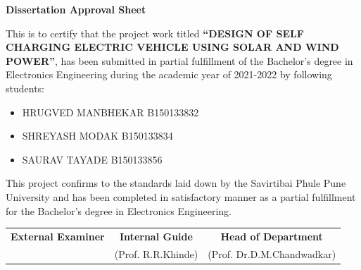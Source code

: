\documentclass[a4paper,12pt]{article}
\begin{document}
\newpage
\thispagestyle{empty}
\begin{center}
\Large\textbf{Dissertation Approval Sheet}\\[1cm]
\end{center}
\large This is to certify that the project work titled \textbf{“DESIGN OF SELF CHARGING ELECTRIC VEHICLE USING SOLAR AND WIND POWER”}, has been submitted in partial fulfillment of the Bachelor’s degree in Electronics Engineering during the academic year of 2021-2022 by following students:\\[2cm]
\begin{itemize}
\item HRUGVED MANBHEKAR {B150133832}\\
\item SHREYASH MODAK {B150133834}\\
\item SAURAV TAYADE {B150133856}\\[2cm]
\end{itemize}
\large This project confirms to the standards laid down by the Savirtibai Phule Pune University and has been completed in satisfactory manner as a partial fulfillment for the Bachelor’s degree in Electronics Engineering.\\[2in]
\begin{tabular}{c c c}
\textbf{External Examiner} & \hspace{0.15cm} \textbf{Internal Guide} & \hspace{0.15cm} \textbf{Head of Department}\\

               & \hspace{0.9cm}(Prof. R.R.Khinde)  & \hspace{1cm}(Prof. Dr.D.M.Chandwadkar)\\
\end{tabular}\\

\end{document}
